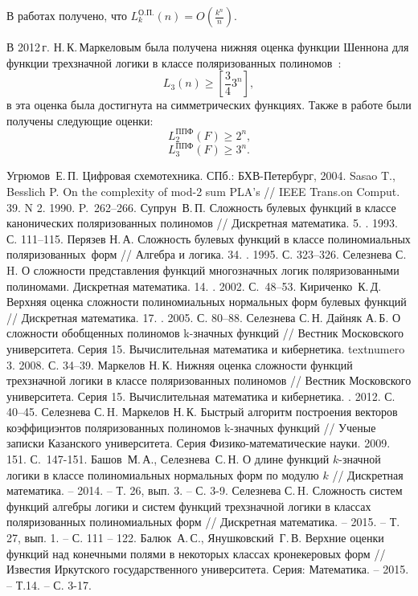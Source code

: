 \documentclass [12pt, a4paper] {article}
\begin{document}
В работах \cite{sd08, bs14} получено, что
$L^{\text{О.П.}}_k(n) = O(\frac{k ^ n}{n})$.

В 2012\,г. Н.\,К.\,Маркеловым была получена нижняя оценка функции Шеннона для
функции трехзначной логики в классе поляризованных полиномов~\cite{mn12}:
$$
L_3(n) \geqslant \left[\frac{3}{4}3^n\right],
$$
в \cite{ss15} эта оценка была достигнута на симметрических функциях.
Также в работе \cite{ss15} были получены следующие оценки:
$$
L_2^\text{ППФ}(F) \geqslant 2^n \text{,}
$$
$$
L_3^\text{ППФ}(F) \geqslant 3^n \text{.}
$$


\makeatletter
\renewcommand*{\@biblabel}[1]{\hfill#1.}
\makeatother

\newpage

\begin{thebibliography}{0}
 Угрюмов~Е.\,П. Цифровая схемотехника. СПб.: БХВ-Петербург, 2004.
 Sasao T., Besslich P. On the complexity of mod-2 sum PLA’s  //
    IEEE Trans.on Comput. 39. N 2. 1990. P.~262--266.
 Супрун~В.\,П. Сложность булевых функций в классе канонических
    поляризованных полиномов // Дискретная математика. 5.
    . 1993. С. 111--115.
 Перязев Н.\,А. Сложность булевых функций в классе полиномиальных
    поляризованных~форм // Алгебра и логика. 34.
    . 1995. С. 323--326.
 Селезнева С.\,H. О сложности представления функций многозначных
    логик поляризованными полиномами. Дискретная
    математика. 14. . 2002. С.~48--53.
 Кириченко~К.\,Д. Верхняя оценка сложности полиномиальных
    нормальных форм булевых функций
    // Дискретная математика. 17. . 2005. С. 80--88.
 Селезнева С.\,Н. Дайняк А.\,Б. О сложности обобщенных
    полиномов k\nobreakdash-значных функций // Вестник Московского
    университета. Серия 15. Вычислительная математика и кибернетика. 
        textnumero 3. 2008. С. 34--39.
 Маркелов Н.\,К. Нижняя оценка сложности функций трехзначной
    логики в классе поляризованных полиномов // Вестник
    Московского университета. Серия 15. Вычислительная математика и
        кибернетика. . 2012. С. 40--45.
 Селезнева С.\,H. Маркелов Н.\,К. Быстрый алгоритм построения
    векторов коэффициэнтов поляризованных полиномов
    k-значных функций // Ученые записки Казанского университета. Серия
        Физико-математические науки. 2009. 151.
     С.~147-151.
 Башов~М.\,А., Селезнева~С.\,Н. О длине функций $k$-значной
    логики в классе полиномиальных нормальных
    форм по модулю $k$ // Дискретная математика. -- 2014. -- Т. 26,
        вып. 3. -- С. 3-9.
 Селезнева С.\,H. Сложность систем функций алгебры логики и
    систем функций трехзначной логики в классах
    поляризованных полиномиальных форм // Дискретная математика. -- 2015. --
        Т. 27, вып. 1. -- С. 111 -- 122. 
 Балюк~А.\,С., Янушковский~Г.\,В. Верхние оценки функций над
    конечными полями в некоторых классах
    кронекеровых форм // Известия Иркутского государственного университета.
        Серия: Математика. -- 2015. -- Т.14. -- С. 3-17.
\end{thebibliography}
\end{document}
